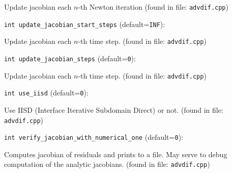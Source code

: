 Update jacobian each $n$-th Newton iteration
 (found in file: \verb+advdif.cpp+)
\item\verb+int update_jacobian_start_steps+ {\rm(default=\verb|INF|)}:

Update jacobian each $n$-th time step. 
 (found in file: \verb+advdif.cpp+)
\item\verb+int update_jacobian_steps+ {\rm(default=\verb|0|)}:

Update jacobian each $n$-th time step. 
 (found in file: \verb+advdif.cpp+)
\item\verb+int use_iisd+ {\rm(default=\verb|0|)}:

Use IISD (Interface Iterative Subdomain Direct) or not.
 (found in file: \verb+advdif.cpp+)
\item\verb+int verify_jacobian_with_numerical_one+ {\rm(default=\verb|0|)}:

Computes jacobian of residuals and prints to a file.
 May serve to debug computation of the analytic jacobians. 
 (found in file: \verb+advdif.cpp+)
